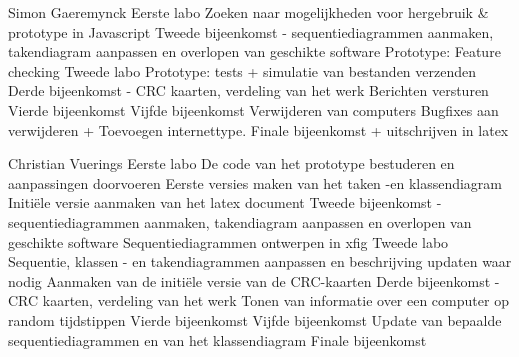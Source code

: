 \documentclass[a4paper,oneside]{report}
\begin{document}
\begin{studentlog}{Simon Gaeremynck}
{Eerste labo}
{Zoeken naar mogelijkheden voor hergebruik \& prototype in Javascript}
{Tweede bijeenkomst - sequentiediagrammen aanmaken, takendiagram aanpassen en overlopen van geschikte software}
{Prototype: Feature checking}
{Tweede labo}
{Prototype: tests + simulatie van bestanden verzenden}
{Derde bijeenkomst - CRC kaarten, verdeling van het werk}
{Berichten versturen}
{Vierde bijeenkomst}
{Vijfde bijeenkomst}
{Verwijderen van computers}
{Bugfixes aan verwijderen + Toevoegen internettype.}
{Finale bijeenkomst + uitschrijven in latex}
\end{studentlog}

\begin{studentlog}{Christian Vuerings}
{Eerste labo}
{De code van het prototype bestuderen en aanpassingen doorvoeren}
{Eerste versies maken van het taken -en klassendiagram}
{Initiële versie aanmaken van het latex document}
{Tweede bijeenkomst - sequentiediagrammen aanmaken, takendiagram aanpassen en overlopen van geschikte software}
{Sequentiediagrammen ontwerpen in xfig}
{Tweede labo}
{Sequentie, klassen - en takendiagrammen aanpassen en beschrijving updaten waar nodig}
{Aanmaken van de initiële versie van de CRC-kaarten}
{Derde bijeenkomst - CRC kaarten, verdeling van het werk}
{Tonen van informatie over een computer op random tijdstippen}   
{Vierde bijeenkomst}
{Vijfde bijeenkomst}
{Update van bepaalde sequentiediagrammen en van het klassendiagram}
{Finale bijeenkomst}
\end{studentlog}
\end{document}
